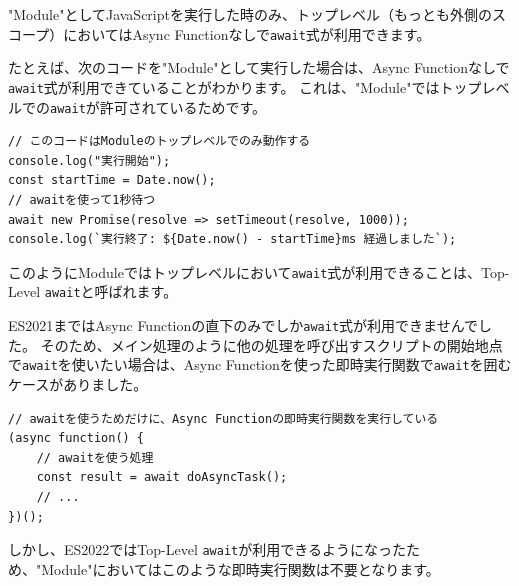"Module"としてJavaScriptを実行した時のみ、トップレベル（もっとも外側のスコープ）においてはAsync Functionなしで\texttt{await}式が利用できます。

たとえば、次のコードを"Module"として実行した場合は、Async Functionなしで\texttt{await}式が利用できていることがわかります。
これは、"Module"ではトップレベルでの\texttt{await}が許可されているためです。

\begin{lstlisting}
// このコードはModuleのトップレベルでのみ動作する
console.log("実行開始");
const startTime = Date.now();
// awaitを使って1秒待つ
await new Promise(resolve => setTimeout(resolve, 1000));
console.log(`実行終了: ${Date.now() - startTime}ms 経過しました`);
\end{lstlisting}

このようにModuleではトップレベルにおいて\texttt{await}式が利用できることは、Top-Level \texttt{await}と呼ばれます。

ES2021まではAsync Functionの直下のみでしか\texttt{await}式が利用できませんでした。
そのため、メイン処理のように他の処理を呼び出すスクリプトの開始地点で\texttt{await}を使いたい場合は、Async Functionを使った即時実行関数で\texttt{await}を囲むケースがありました。

\begin{lstlisting}
// awaitを使うためだけに、Async Functionの即時実行関数を実行している
(async function() {
    // awaitを使う処理
    const result = await doAsyncTask();
    // ...
})();
\end{lstlisting}

しかし、ES2022ではTop-Level \texttt{await}が利用できるようになったため、"Module"においてはこのような即時実行関数は不要となります。

